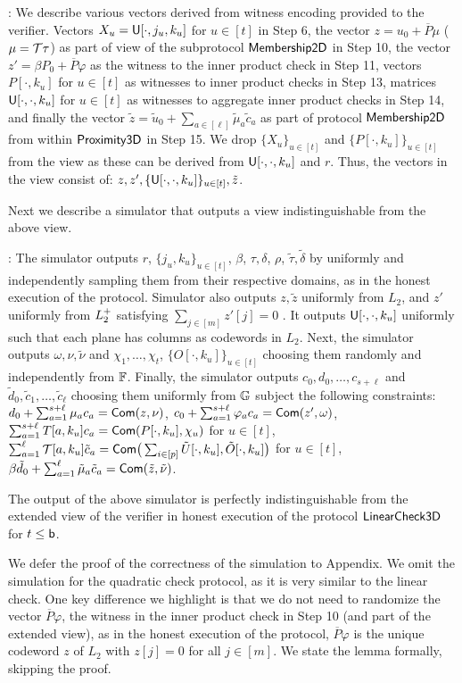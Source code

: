 : We describe various vectors derived from
witness encoding provided to the verifier. Vectors $X_u=\mathsf{U}[\cdot,j_u,k_u]$
for $u\in [t]$ in Step 6, the vector $z=u_0 + \overline{P}\mu$ ($\mu=\mathcal{T}\tau$) as
part of view of the subprotocol $\mathsf{Membership2D}$ in Step 10, the vector
$z'=\beta P_0+\overline{P}\varphi$ as the witness to the inner product check in Step
11, vectors $P[\cdot,k_u]$ for $u\in [t]$ as witnesses to inner product checks
in Step 13, matrices $\mathsf{U}[\cdot,\cdot,k_u]$ for $u\in [t]$ as witnesses to
aggregate inner product checks in Step 14, and finally the vector
$\tilde{z}=\tilde{u}_0 + \sum_{a\in [\ell]}\tilde{\mu}_a\tilde{c}_a$ as part of
protocol $\mathsf{Membership2D}$ from within $\mathsf{Proximity3D}$ in Step 15. We drop
$\{X_u\}_{u\in [t]}$ and $\{P[\cdot,k_u]\}_{u\in [t]}$ from the view as these
can be derived from $\mathsf{U}[\cdot,\cdot,k_u]$ and $r$. Thus, the vectors in the
view consist of: $z,z',\{\mathsf{U}[\cdot,\cdot,k_u]\}_{u\in [t]},\tilde{z}$.

Next we describe a simulator that outputs a view indistinguishable from the
above view.

: The simulator outputs $r$, $\{j_u,k_u\}_{u\in [t]}$,
$\beta$, $\tau,\delta$, $\rho$, $\tilde{\tau},\tilde{\delta}$ by uniformly and
independently sampling them from their respective domains, as in the honest
execution of the protocol. Simulator also outputs $z,\tilde{z}$ uniformly from
$L_2$, and $z'$ uniformly from $L^{+}_2$ satisfying $\sum_{j\in [m]}z'[j]=0$ . It outputs
$\mathsf{U}[\cdot,\cdot,k_u]$ uniformly such that each plane has columns as codewords
in $L_2$. 
Next, the simulator outputs $\omega,\nu,\tilde{\nu}$
and $\chi_1,\ldots,\chi_t$, $\{O[\cdot,k_u]\}_{u\in [t]}$ choosing them randomly and
independently from $\mathbb{F}$. Finally, the simulator outputs
$c_0,d_0,\ldots,c_{s+\ell}$ and $\tilde{d}_0,\tilde{c}_1,\ldots,\tilde{c}_\ell$ choosing 
them uniformly from $\mathbb{G}$ subject the following constraints:
$d_0 + \sum_{a=1}^{s+\ell}\mu_ac_a = \mathsf{Com}(z,\nu)$,
$c_0 + \sum_{a=1}^{s+\ell}\varphi_ac_a = \mathsf{Com}(z',\omega)$,
$\sum_{a=1}^{s+\ell}T[a,k_u]c_a = \mathsf{Com}(P[\cdot,k_u],\chi_u)$ for $u\in [t]$,
$\sum_{a=1}^{\ell}\mathcal{T}[a,k_u]\tilde{c}_a = \mathsf{Com}\big(\sum_{i\in
[p]}\tilde{U}[\cdot,k_u],\tilde{O}[\cdot, k_u]\big)$ for $u\in [t]$,
$\beta\tilde{d}_0 + \sum_{a=1}^{\ell}\tilde{\mu}_a\tilde{c}_a =
\mathsf{Com}(\tilde{z},\tilde{\nu})$. 

\begin{lemma}\label{lem:simlincheck}
The output of the above simulator is perfectly indistinguishable
from the extended view of the verifier in honest execution of the protocol
$\mathsf{LinearCheck3D}$ for $t\leq \mathsf{b}$.
\end{lemma}
We defer the proof of the correctness of the simulation to Appendix.
We omit the simulation for the quadratic check protocol, as it is very similar
to the linear check. One key difference we highlight is that we do not need to
randomize the vector $\overline{P}\varphi$, the witness in the inner product check in
Step 10 (and part of the extended view), as in the honest execution of the
protocol, $\overline{P}\varphi$ is the unique codeword $z$ of $L_2$ with $z[j]=0$ for
all $j\in [m]$. We state the lemma formally, skipping the proof.

